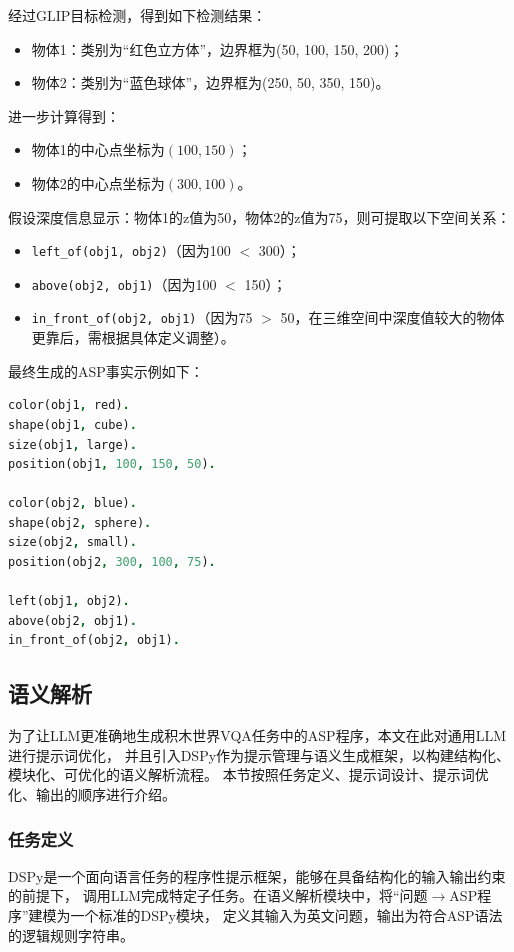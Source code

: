 经过GLIP目标检测，得到如下检测结果： 
\begin{itemize}[itemsep=0pt,parsep=0pt] 
    \item 物体1：类别为“红色立方体”，边界框为(50, 100, 150, 200)； 
    \item 物体2：类别为“蓝色球体”，边界框为(250, 50, 350, 150)。 
\end{itemize}

进一步计算得到： 
\begin{itemize}[itemsep=0pt,parsep=0pt] 
    \item 物体1的中心点坐标为$(100,150)$； 
    \item 物体2的中心点坐标为$(300,100)$。 
\end{itemize}

假设深度信息显示：物体1的z值为50，物体2的z值为75，则可提取以下空间关系： 
\begin{itemize}[itemsep=0pt,parsep=0pt] 
    \item \texttt{left\_of(obj1, obj2)}（因为100 $<$ 300）； 
    \item \texttt{above(obj2, obj1)}（因为100 $<$ 150）； 
    \item \texttt{in\_front\_of(obj2, obj1)}（因为75 $>$ 50，在三维空间中深度值较大的物体更靠后，需根据具体定义调整）。 
\end{itemize}

最终生成的ASP事实示例如下： 
\begin{lstlisting}[language=Prolog] 
color(obj1, red). 
shape(obj1, cube). 
size(obj1, large). 
position(obj1, 100, 150, 50).

color(obj2, blue). 
shape(obj2, sphere). 
size(obj2, small). 
position(obj2, 300, 100, 75).

left(obj1, obj2). 
above(obj2, obj1). 
in_front_of(obj2, obj1). 
\end{lstlisting}
\subsection{语义解析}
为了让LLM更准确地生成积木世界VQA任务中的ASP程序，本文在此对通用LLM进行提示词优化，
并且引入DSPy作为提示管理与语义生成框架，以构建结构化、模块化、可优化的语义解析流程。
本节按照任务定义、提示词设计、提示词优化、输出的顺序进行介绍。
\subsubsection{任务定义}
DSPy是一个面向语言任务的程序性提示框架，能够在具备结构化的输入输出约束的前提下，
调用LLM完成特定子任务。在语义解析模块中，将“问题$\rightarrow$ASP程序”建模为一个标准的DSPy模块，
定义其输入为英文问题，输出为符合ASP语法的逻辑规则字符串。

